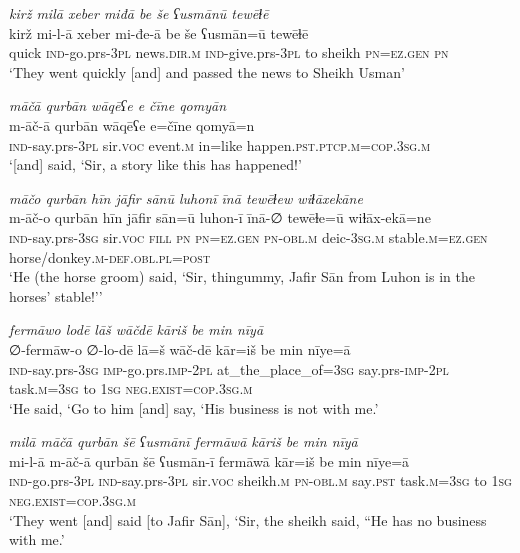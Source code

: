 \ea \label{ŠJ.68}
\textit{kirž milā xeber miđā be še ʕusmānū tewēɫē} \\ 
\gll kirž mi-l-ā xeber mi-đe-ā be še ʕusmān=ū tewēɫē \\ 
 quick \textsc{ind-}go.prs\textsc{-3pl} news\textsc{.dir}\textsc{.m} \textsc{ind-}give.prs\textsc{-3pl} to sheikh \textsc{pn}\textsc{=ez.gen} \textsc{pn} \\ 
\glt `They went quickly [and] and passed the news to Sheikh Usman'
\z 
 
\ea \label{ŠJ.69}
\textit{māčā qurbān wāqēʕe e čīne qomyān} \\ 
\gll m-āč-ā qurbān wāqēʕe e=čīne qomyā=n \\ 
 \textsc{ind-}say.prs\textsc{-3pl} sir.\textsc{voc} event\textsc{.m} in=like happen\textsc{.pst}\textsc{.ptcp}\textsc{.m}\textsc{=cop}\textsc{.3sg}\textsc{.m} \\ 
\glt `[and] said, ‘Sir, a story like this has happened!'
\z 
 
\ea \label{ŠJ.71}
\textit{māčo qurbān hīn jāfir sānū luhonī īnā tewēɫew wiɫāxekāne} \\ 
\gll m-āč-o qurbān hīn jāfir sān=ū luhon-ī īnā-∅ tewēɫe=ū wiɫāx-ekā=ne \\ 
 \textsc{ind-}say.prs\textsc{-3sg} sir.\textsc{voc} \textsc{fill} \textsc{pn} \textsc{pn}\textsc{=ez.gen} \textsc{pn}\textsc{-obl}\textsc{.m} deic\textsc{-3sg}\textsc{.m} stable\textsc{.m}\textsc{=ez.gen} horse/donkey\textsc{.m}\textsc{-def}\textsc{.obl}\textsc{.pl}\textsc{=\textsc{post}} \\ 
\glt `He (the horse groom) said, ‘Sir, thingummy, Jafir Sān from Luhon is in the horses’ stable!’'
\z 
 
\ea \label{ŠJ.74}
\textit{fermāwo lodē lāš wāčdē kāriš be min nīyā} \\ 
\gll ∅-fermāw-o ∅-lo-dē lā=š wāč-dē kār=iš be min nīye=ā \\ 
 \textsc{ind-}say.prs\textsc{-3sg} \textsc{imp-}go.prs.\textsc{imp-}\textsc{2pl} at\_the\_place\_of\textsc{=3sg} say.prs-\textsc{imp-}\textsc{2pl} task\textsc{.m}\textsc{=3sg} to \textsc{1sg} \textsc{\textsc{neg.}exist}\textsc{=cop}\textsc{.3sg}\textsc{.m} \\ 
\glt `He said, ‘Go to him [and] say, ‘His business is not with me.'
\z 
 
\ea \label{ŠJ.77}
\textit{milā māčā qurbān šē ʕusmānī fermāwā kāriš be min nīyā} \\ 
\gll mi-l-ā m-āč-ā qurbān šē ʕusmān-ī fermāwā kār=iš be min nīye=ā \\ 
 \textsc{ind-}go.prs\textsc{-3pl} \textsc{ind-}say.prs\textsc{-3pl} sir.\textsc{voc} sheikh\textsc{.m} \textsc{pn}\textsc{-obl}\textsc{.m} say\textsc{.pst} task\textsc{.m}\textsc{=3sg} to \textsc{1sg} \textsc{\textsc{neg.}exist}\textsc{=cop}\textsc{.3sg}\textsc{.m} \\ 
\glt `They went [and] said [to Jafir Sān], ‘Sir, the sheikh said, “He has no business with me.'
\z 
 
